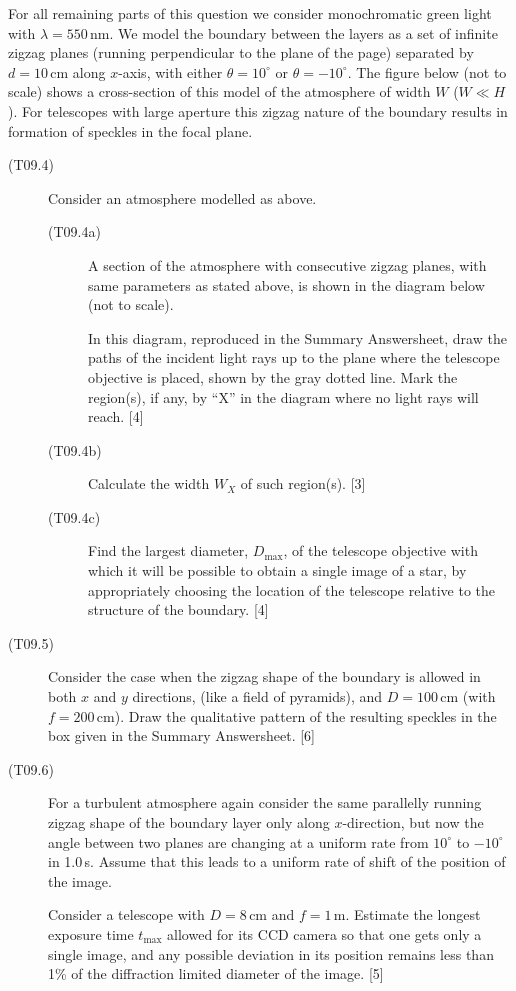 For all remaining parts of this question we consider monochromatic green
light with $\lambda = 550$\,nm. We model the boundary between the layers as
a set of infinite zigzag planes (running perpendicular to the plane of the
page) separated by $d = 10$\,cm along $x$-axis, with either
$\theta = 10^\circ$ or $\theta = -10^\circ$. The figure below (not to scale)
shows a cross-section of this model of the atmosphere of width $W$
($W \ll H$). For telescopes with large aperture this zigzag nature of the
boundary results in formation of speckles in the focal plane.


\begin{description}
\item[(T09.4)] Consider an atmosphere modelled as above.
  \begin{description}
  \item[(T09.4a)] A section of the atmosphere with consecutive zigzag
    planes, with same parameters as stated above, is shown in the diagram
    below (not to scale).


    In this diagram, reproduced in the Summary Answersheet, draw the paths
    of the incident light rays up to the plane where the telescope objective
    is placed, shown by the gray dotted line. Mark the region(s), if any, by
    ``X'' in the diagram where no light rays will reach. \hfill[4]
  \item[(T09.4b)] Calculate the width $W_X$ of such region(s). \hfill[3]
  \item[(T09.4c)] Find the largest diameter, $D_{\max}$, of the telescope
    objective with which it will be possible to obtain a single image of a
    star, by appropriately choosing the location of the telescope relative
    to the structure of the boundary. \hfill[4]
  \end{description}
\item[(T09.5)] Consider the case when the zigzag shape of the boundary is
  allowed in both $x$ and $y$ directions, (like a field of pyramids), and
  $D = 100$\,cm (with $f = 200$\,cm). Draw the qualitative pattern of the
  resulting speckles in the box given in the Summary Answersheet. \hfill[6]
\item[(T09.6)] For a turbulent atmosphere again consider the same parallelly
  running zigzag shape of the boundary layer only along $x$-direction, but
  now the angle between two planes are changing at a uniform rate from
  $10^\circ$ to $-10^\circ$ in 1.0\,s. Assume that this leads to a uniform
  rate of shift of the position of the image.

  Consider a telescope with $D = 8$\,cm and $f = 1$\,m. Estimate the longest
  exposure time $t_{\max}$ allowed for its CCD camera so that one gets only
  a single image, and any possible deviation in its position remains less
  than 1\% of the diffraction limited diameter of the image. \hfill[5]
\end{description}

